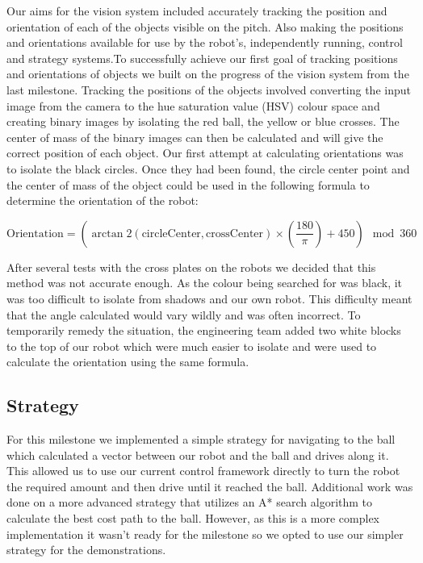 \documentclass[12pt, a4paper, titlepage]{article}
\begin{document}
Our aims for the vision system included accurately tracking the position and
orientation of each of the objects visible on the pitch. Also making the
positions and orientations available for use by the robot’s, independently
running, control and strategy systems.To successfully achieve our first goal of
tracking positions and orientations of objects we built on the progress of the
vision system from the last milestone. Tracking the positions of the objects
involved converting the input image from the camera to the hue saturation value
(HSV) colour space and creating binary images by isolating the red ball, the
yellow or blue crosses. The center of mass of the binary images can then be
calculated and will give the correct position of each object. Our first attempt
at calculating orientations was to isolate the black circles. Once they had been
found, the circle center point and the center of mass of the object could be
used in the following formula to determine the orientation of the robot:

\begin{equation*}
\mbox{Orientation} = (\arctan2(\mbox{circleCenter}, \mbox{crossCenter}) \times \left(\frac{180}{\pi}\right) + 450) \mod 360
\end{equation*}

After several tests with the cross plates on the robots we decided that this
method was not accurate enough. As the colour being searched for was black, it
was too difficult to isolate from shadows and our own robot. This difficulty
meant that the angle calculated would vary wildly and was often incorrect. To
temporarily remedy the situation, the engineering team added two white blocks
to the top of our robot which were much easier to isolate and were used to
calculate the orientation using the same formula.

\subsection{Strategy}

For this milestone we implemented a simple strategy for navigating to the ball
which calculated a vector between our robot and the ball and drives along it.
This allowed us to use our current control framework directly to turn the robot
the required amount and then drive until it reached the ball. Additional work
was done on a more advanced strategy that utilizes an A* search algorithm to
calculate the best cost path to the ball. However, as this is a more complex
implementation it wasn’t ready for the milestone so we opted to use our
simpler strategy for the demonstrations.
\end{document}
